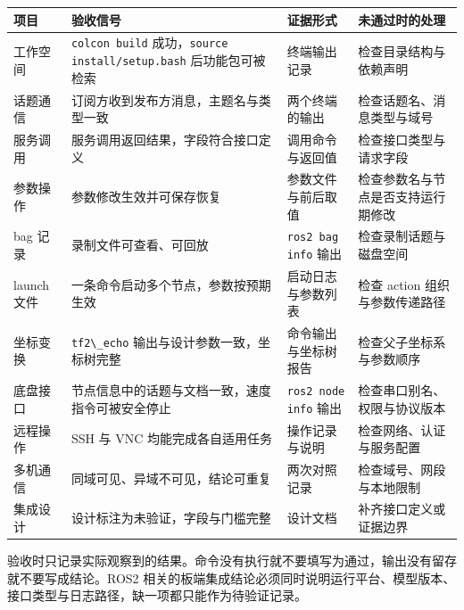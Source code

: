 \begin{longtable}[]{@{}
  >{\raggedright\arraybackslash}p{}
  >{\raggedright\arraybackslash}p{}
  >{\raggedright\arraybackslash}p{}
  >{\raggedright\arraybackslash}p{}@{}}
\toprule\noalign{}
\begin{minipage}[b]{\linewidth}\raggedright
项目
\end{minipage} & \begin{minipage}[b]{\linewidth}\raggedright
验收信号
\end{minipage} & \begin{minipage}[b]{\linewidth}\raggedright
证据形式
\end{minipage} & \begin{minipage}[b]{\linewidth}\raggedright
未通过时的处理
\end{minipage} \\
\midrule\noalign{}
\endhead
\bottomrule\noalign{}
\endlastfoot
工作空间 & \passthrough{\lstinline!colcon build!}
成功，\passthrough{\lstinline!source install/setup.bash!}
后功能包可被检索 & 终端输出记录 & 检查目录结构与依赖声明 \\
话题通信 & 订阅方收到发布方消息，主题名与类型一致 & 两个终端的输出 &
检查话题名、消息类型与域号 \\
服务调用 & 服务调用返回结果，字段符合接口定义 & 调用命令与返回值 &
检查接口类型与请求字段 \\
参数操作 & 参数修改生效并可保存恢复 & 参数文件与前后取值 &
检查参数名与节点是否支持运行期修改 \\
bag 记录 & 录制文件可查看、可回放 &
\passthrough{\lstinline!ros2 bag info!} 输出 & 检查录制话题与磁盘空间 \\
launch 文件 & 一条命令启动多个节点，参数按预期生效 & 启动日志与参数列表
& 检查 action 组织与参数传递路径 \\
坐标变换 & \passthrough{\lstinline!tf2\_echo!}
输出与设计参数一致，坐标树完整 & 命令输出与坐标树报告 &
检查父子坐标系与参数顺序 \\
底盘接口 & 节点信息中的话题与文档一致，速度指令可被安全停止 &
\passthrough{\lstinline!ros2 node info!} 输出 &
检查串口别名、权限与协议版本 \\
远程操作 & SSH 与 VNC 均能完成各自适用任务 & 操作记录与说明 &
检查网络、认证与服务配置 \\
多机通信 & 同域可见、异域不可见，结论可重复 & 两次对照记录 &
检查域号、网段与本地限制 \\
集成设计 & 设计标注为未验证，字段与门槛完整 & 设计文档 &
补齐接口定义或证据边界 \\
\end{longtable}

验收时只记录实际观察到的结果。命令没有执行就不要填写为通过，输出没有留存就不要写成结论。ROS2
相关的板端集成结论必须同时说明运行平台、模型版本、接口类型与日志路径，缺一项都只能作为待验证记录。
